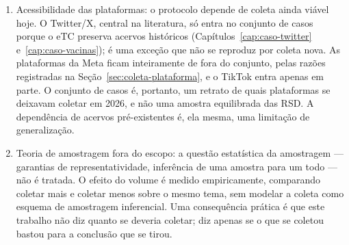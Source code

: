 \begin{enumerate}
  \item Acessibilidade das plataformas: o protocolo depende de coleta ainda viável
  hoje. O Twitter/X, central na literatura, só entra no conjunto de casos porque o
  eTC preserva acervos históricos (Capítulos~\ref{cap:caso-twitter}
  e~\ref{cap:caso-vacinas}); é uma exceção que não se reproduz por coleta nova. As
  plataformas da Meta ficam inteiramente de fora do conjunto, pelas razões
  registradas na Seção~\ref{sec:coleta-plataforma}, e o TikTok entra apenas em
  parte. O conjunto de casos é, portanto, um retrato de quais plataformas se
  deixavam coletar em 2026, e não uma amostra equilibrada das RSD. A dependência de
  acervos pré-existentes é, ela mesma, uma limitação de generalização.

  \item Teoria de amostragem fora do escopo: a questão estatística da amostragem
  --- garantias de representatividade, inferência de uma amostra para um todo --- não
  é tratada. O efeito do volume é medido empiricamente, comparando coletar mais e
  coletar menos sobre o mesmo tema, sem modelar a coleta como esquema de amostragem
  inferencial. Uma consequência prática é que este trabalho não diz quanto se deveria
  coletar; diz apenas se o que se coletou bastou para a conclusão que se tirou.


\end{enumerate}

